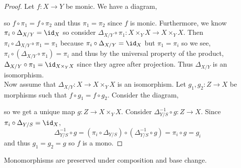 \documentclass[12pt]{article}
\begin{document}
\begin{proof}
Let $f : X \to Y$ be monic. We have a diagram,
\begin{center}
\end{center}
so $f \circ \pi_1 = f \circ \pi_2$ and thus $\pi_1 = \pi_2$ since $f$ is monic. Furthermore, we know $\pi_i \circ \Delta_{X/Y} = \id_X$ so consider $\Delta_{X/Y} \circ \pi_1 : X \times_Y X \to X \times_Y X$. Then $\pi_i \circ \Delta_{X/Y} \circ \pi_1 = \pi_1$ because $\pi_i \circ \Delta_{X/Y} = \id_X$ but $\pi_1 = \pi_i$ so we see, $\pi_i \circ (\Delta_{X/Y} \circ \pi_1) = \pi_i$ and thus by the universal property of the product, $\Delta_{X/Y} \circ \pi_1 = \id_{X \times_Y X}$ since they agree after projection. Thus $\Delta_{X/Y}$ is an isomorphism.
\bigskip\\
Now assume that $\Delta_{X/Y} : X \to X \times_Y X$ is an isomorphism. Let $g_1, g_2 : Z \to X$ be morphisms such that $f \circ g_1 = f \circ g_2$. Consider the diagram,
\begin{center}
\end{center}
so we get a unique map $g : Z \to X \times_Y X$. Consider $\Delta_{Y/S}^{-1} \circ g : Z \to X$. Since $\pi_i \circ \Delta_{Y/S} = \id_X$,
\[ \Delta_{Y/S}^{-1} \circ g = (\pi_i \circ \Delta_{Y/S}) \circ (\Delta_{Y/S}^{-1} \circ g) = \pi_i \circ g = g_i \]
and thus $g_1 = g_2 = g$ so $f$ is a mono.
\end{proof}

\begin{lemma}
Monomorphisms are preserved under composition and base change.
\end{lemma}
\end{document}
